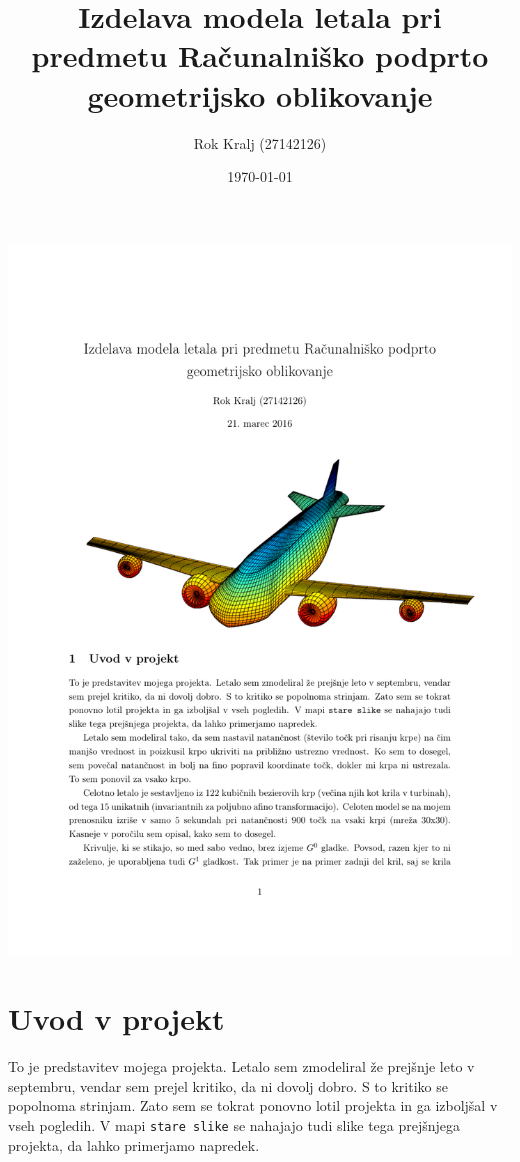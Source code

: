 \documentclass[a4paper,11pt]{article}
\title{Izdelava modela letala pri predmetu Računalniško podprto geometrijsko oblikovanje}
\author{Rok Kralj (27142126)}
\date{\today}
\begin{document}
	\maketitle
	
	\includegraphics[scale=0.55]{letalo}
	
	\section{Uvod v projekt}
	
	To je predstavitev mojega projekta. Letalo sem zmodeliral že prejšnje leto v septembru, vendar sem prejel kritiko, da ni dovolj dobro. S to kritiko se popolnoma strinjam. Zato sem se tokrat ponovno lotil projekta in ga izboljšal v vseh pogledih. V mapi \texttt{stare slike} se nahajajo tudi slike tega prejšnjega projekta, da lahko primerjamo napredek.
	
\end{document}
